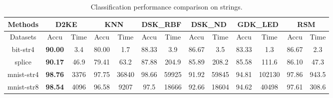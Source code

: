 \documentclass{article}
\newcommand{\1}{\mathbf{1}}
\begin{document}
\begin{table*}[th]
\centering
\caption{Classification performance comparison on strings.} 
\label{tb:comp_strings}
\scriptsize
\newcommand{\Bd}[1]{\textbf{#1}}
\vspace{-4mm}
\begin{center}
    \begin{tabular}{ c cc cc cc cc cc cc}
    \hline
    \multicolumn{1}{c}{Methods}
    & \multicolumn{2}{c}{D2KE} 
    & \multicolumn{2}{c}{KNN}
    & \multicolumn{2}{c}{DSK\_RBF} 
    & \multicolumn{2}{c}{DSK\_ND} 
    & \multicolumn{2}{c}{GDK\_LED}
    & \multicolumn{2}{c}{RSM} \\ \hline 
	\multicolumn{1}{c}{Datasets} & Accu & Time & Accu & Time & Accu & Time & Accu & Time & Accu & Time & Accu & Time \\ \hline
	bit-str4  & \Bd{90.00} & 3.4 & 80.00 & 1.7 & 88.33 & 3.9 & 86.67 & 3.5 & 83.33 & 1.3 & 86.67 & 2.3\\
	splice & \Bd{90.17} & 46.9 & 79.41 & 63.2 & 87.88 & 204.9 & 85.89 & 208.2 & 85.58 & 111.6 & 86.10 & 47.3 \\
	mnist-str4 & \Bd{98.76} & 3376 & 97.75 & 36840 & 98.66 & 59925 & 91.92 & 59845 & 94.81 & 102130 & 97.86 & 943.5 \\ 
    mnist-str8 & \Bd{98.54} & 4096 & 96.58 & 9207 & 97.5 & 18666 & 92.66 & 18604 & 94.62 & 40498 & 97.61 & 308.6 \\ \hline
    \end{tabular}   
\end{center}
\vspace{-4mm}
\end{table*}
\end{document}
